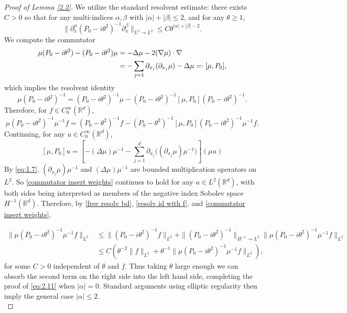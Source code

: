 \documentclass[11pt]{amsart}
\numberwithin{equation}{section}
\def\R{{\mathbb R}}
\newcommand*{\qefed}{=\mathrel{\vcenter{\baselineskip0.5ex \lineskiplimit0pt

                     \hbox{\scriptsize.}\hbox{\scriptsize.}}}%
                     }
\begin{document}
 \begin{proof}[Proof of Lemma \ref{2.2}] 
We utilize the standard resolvent estimate: there exists $C > 0$ so that for any multi-indices $\alpha, \beta$ with $|\alpha| + |\beta| \le 2$, and for any $\theta \ge 1$, 
\begin{equation} \label{free resolv bd}
\| \partial_x^\alpha (P_0 - i\theta^2)^{-1} \partial_x^\beta \|_{L^2 \to L^2} \le C \theta^{|\alpha| + |\beta| - 2}.
\end{equation}
 We compute the commutator
\begin{equation*}
\begin{split}
\mu(P_0 - i \theta^2) - (P_0 - i\theta^2) \mu &= - \Delta \mu -2 (\nabla \mu) \cdot \nabla  \\
&=- \sum_{j =1} \partial_{x_j} (\partial_{x_j} \mu) - \Delta \mu \qefed [ \mu, P_0],
\end{split}
\end{equation*}
which implies the resolvent identity
\begin{equation*}
\mu (P_0 - i\theta^2)^{-1} = (P_0 - i \theta^2)^{-1}  \mu -  (P_0 - i \theta^2)^{-1}  [ \mu, P_0]  (P_0 - i \theta^2)^{-1} .
\end{equation*}
Therefore, for $f \in C_0^\infty(\R^d)$, 
\begin{equation} \label{resolv id with f}
\mu(P_0 - i \theta^2)^{-1} \mu^{-1} f = (P_0 - \theta^2)^{-1} f -  (P_0 - \theta^2)^{-1} [\mu, P_0] (P_0 - i\theta^2)^{-1} \mu^{-1} f.
\end{equation}
Continuing, for any $u \in C_0^\infty(\R^d)$, 
\begin{equation} \label{commutator insert weights}
[\mu, P_0] u = \left[ -(\Delta \mu) \mu^{-1} - \sum_{j=1}^d \partial_{x_j} \big((\partial_{x_j} \mu) \mu^{-1} \big)  \right] (\mu u)
\end{equation}
By \eqref{eq:1.7}, $(\partial_{x_j} \mu)\mu^{-1}$ and $(\Delta \mu) \mu^{-1}$ are bounded multiplication operators on $L^2$. So \eqref{commutator insert weights} continues to hold for any $u \in L^2(\R^d)$, with both sides being interpreted as members of the negative index Sobolev space $H^{-1}(\R^d)$. Therefore, by \eqref{free resolv bd}, \eqref{resolv id with f}, and \eqref{commutator insert weights}, 

\begin{equation*}
\begin{split}
\| \mu (P_0 - i\theta^2)^{-1} \mu^{-1} f \|_{L^2} &\le \| (P_0 - i\theta^2)^{-1} f \|_{L^2} + \| (P_0 - i\theta^2)^{-1} \|_{H^{-1} \to L^2} \| \mu (P_0 - i\theta^2)^{-1} \mu^{-1} f \|_{L^2} \\
& \le C(\theta^{-2} \| f\|_{L^2} + \theta^{-1} \| \mu (P_0 - i\theta^2)^{-1} \mu^{-1} f \|_{L^2}),
\end{split} 
\end{equation*}
for some $C > 0$ independent of $\theta$ and $f$. Thus taking $\theta$ large enough we can absorb the second term on the right side into the left hand side, completing the proof of \eqref{eq:2.11} when $|\alpha| = 0$. Standard arguments using elliptic regularity then imply the general case  $|\alpha | \le 2$.\\
 \end{proof}
 
\end{document}
